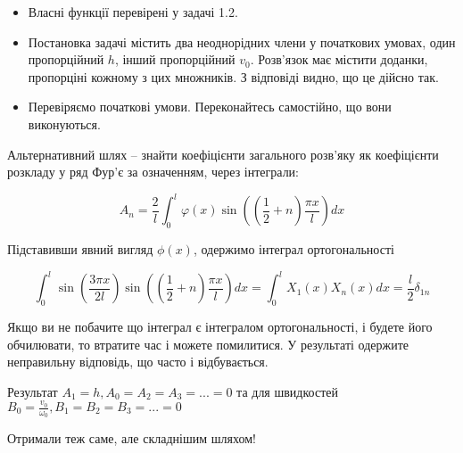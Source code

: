\begin{itemize}
    \item Власні функції перевірені у задачі 1.2.
    \item Постановка задачі містить два неоднорідних члени у початкових умовах, один пропорційний $h$, інший пропорційний $v_0$. Розв'язок має містити доданки, пропорціні кожному з цих множників. З відповіді видно, що це дійсно так.
    \item Перевіряємо початкові умови. Переконайтесь самостійно, що вони виконуються.

\end{itemize}

Альтернативний шлях -- знайти коефіцієнти загального розв'яку як коефіцієнти розкладу у ряд Фур'є за означенням, через інтеграли:

\begin{equation}
A_n = \frac{2}{l} \int_{0}^{l} \varphi (x)  \sin \left( (\frac{1}{2} + n) \frac{\pi x}{l} \right) dx    
\end{equation}


Підставивши явний вигляд $\phi(x)$, одержимо інтеграл ортогональності 

\begin{equation}
    \int^{l}_0 \sin \left( \frac{3 \pi x}{2 l} \right) \sin \left( \left(\frac{1}{2} + n \right) \frac{\pi x}{l} \right) dx = \int^{l}_0 X_1 (x) X_n (x) dx = \frac{l}{2}\delta_{1n}
\end{equation}

Якщо ви не побачите що інтеграл є інтегралом ортогональності, і будете його обчилювати, то втратите час і можете помилитися. У результаті одержите неправильну відповідь, що часто і відбувається.

Результат $A_1 = h, A_0 = A_2 = A_3 = ... = 0$ та для швидкостей $B_0 = \frac{v_0}{\omega_0}, B_1 = B_2 = B_3 = ... = 0$

Отримали теж саме, але складнішим шляхом!

%